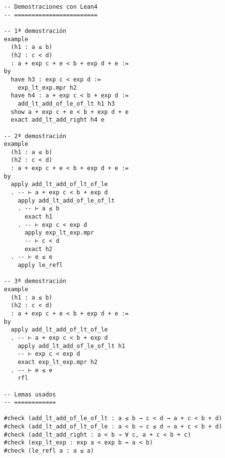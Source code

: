 \begin{verbatim}
-- Demostraciones con Lean4
-- ========================

-- 1ª demostración
example
  (h1 : a ≤ b)
  (h2 : c < d)
  : a + exp c + e < b + exp d + e :=
by
  have h3 : exp c < exp d :=
    exp_lt_exp.mpr h2
  have h4 : a + exp c < b + exp d :=
    add_lt_add_of_le_of_lt h1 h3
  show a + exp c + e < b + exp d + e
  exact add_lt_add_right h4 e

-- 2ª demostración
example
  (h1 : a ≤ b)
  (h2 : c < d)
  : a + exp c + e < b + exp d + e :=
by
  apply add_lt_add_of_lt_of_le
  . -- ⊢ a + exp c < b + exp d
    apply add_lt_add_of_le_of_lt
    . -- ⊢ a ≤ b
      exact h1
    . -- ⊢ exp c < exp d
      apply exp_lt_exp.mpr
      -- ⊢ c < d
      exact h2
  . -- ⊢ e ≤ e
    apply le_refl

-- 3ª demostración
example
  (h1 : a ≤ b)
  (h2 : c < d)
  : a + exp c + e < b + exp d + e :=
by
  apply add_lt_add_of_lt_of_le
  . -- ⊢ a + exp c < b + exp d
    apply add_lt_add_of_le_of_lt h1
    -- ⊢ exp c < exp d
    exact exp_lt_exp.mpr h2
  . -- ⊢ e ≤ e
    rfl

-- Lemas usados
-- ============

#check (add_lt_add_of_le_of_lt : a ≤ b → c < d → a + c < b + d)
#check (add_lt_add_of_lt_of_le : a < b → c ≤ d → a + c < b + d)
#check (add_lt_add_right : a < b → ∀ c, a + c < b + c)
#check (exp_lt_exp : exp a < exp b ↔ a < b)
#check (le_refl a : a ≤ a)
\end{verbatim}

